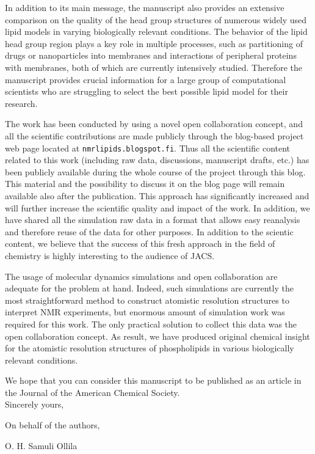 \documentclass[11pt]{letter}
\begin{document}
In addition to its main message, the manuscript also provides an extensive comparison on the quality of the head group 
structures of numerous widely used lipid models in varying biologically relevant conditions. The behavior
of the lipid head group region plays a key role in multiple processes, such as partitioning of drugs or 
nanoparticles into membranes and interactions of peripheral proteins with membranes, both of which are 
currently intensively studied. Therefore the manuscript provides crucial information for a large group
of computational scientists who are struggling to select the best possible lipid model for their research.

The work has been conducted by using a novel open collaboration concept, and all the scientific contributions
are made publicly through the blog-based project web page located at \texttt{nmrlipids.blogspot.fi}. 
Thus all the scientific content related to this work (including raw data, discussions, manuscript drafts, etc.)
has been publicly available during the whole course of the project through this blog. This material and the possibility to 
discuss it on the blog page will remain available also after the publication. This approach has significantly 
increased and will further increase the scientific quality and impact of the work. In addition, we have shared 
all the simulation raw data in a format that allows easy reanalysis and therefore reuse of the data for other purposes. 
In addition to the scientic content, we believe that the success of this fresh approach in the field of chemistry 
is highly interesting to the audience of JACS.

The usage of molecular dynamics simulations and open collaboration are adequate for the
problem at hand. Indeed, such simulations are currently the most straightforward method to 
construct atomistic resolution structures to interpret NMR experiments, but
enormous amount of simulation work was required for this work. The only practical
solution to collect this data was the open collaboration concept.
As result, we have produced original chemical insight for the atomistic resolution 
structures of phospholipids in various biologically relevant conditions.

We hope that you can consider this manuscript to be published as an article in the Journal of the American Chemical Society. \\

Sincerely yours,

On behalf of the authors,

O. H. Samuli Ollila
\end{document}
